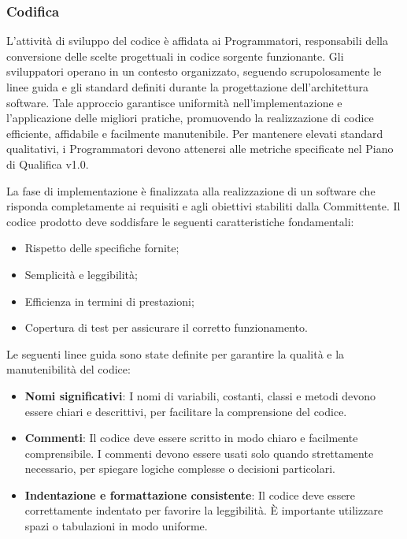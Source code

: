 \begin{table}[h!]
\subsubsection{Codifica}
L'attivit\`a di sviluppo del codice \`e affidata ai Programmatori, responsabili della conversione delle scelte progettuali in codice sorgente funzionante. Gli sviluppatori operano in un contesto organizzato, seguendo scrupolosamente le linee guida e gli standard definiti durante la progettazione dell'architettura software. Tale approccio garantisce uniformit\`a nell'implementazione e l'applicazione delle migliori pratiche, promuovendo la realizzazione di codice efficiente, affidabile e facilmente manutenibile. 
Per mantenere elevati standard qualitativi, i Programmatori devono attenersi alle metriche specificate nel Piano di Qualifica v1.0.

La fase di implementazione \`e finalizzata alla realizzazione di un software che risponda completamente ai requisiti e agli obiettivi stabiliti dalla Committente. Il codice prodotto deve soddisfare le seguenti caratteristiche fondamentali:
\begin{itemize}[noitemsep, topsep=5pt]
    \item Rispetto delle specifiche fornite;
    \item Semplicit\`a e leggibilit\`a;
    \item Efficienza in termini di prestazioni;
    \item Copertura di test per assicurare il corretto funzionamento.
\end{itemize}

Le seguenti linee guida sono state definite per garantire la qualità e la manutenibilità del codice:

\begin{itemize}
  \item \textbf{Nomi significativi}: I nomi di variabili, costanti, classi e metodi devono essere chiari e descrittivi, per facilitare la comprensione del codice.
  
  \item \textbf{Commenti}: Il codice deve essere scritto in modo chiaro e facilmente comprensibile. I commenti devono essere usati solo quando strettamente necessario, per spiegare logiche complesse o decisioni particolari.
  
  \item \textbf{Indentazione e formattazione consistente}: Il codice deve essere correttamente indentato per favorire la leggibilità. È importante utilizzare spazi o tabulazioni in modo uniforme.


\end{itemize}
\end{table}
